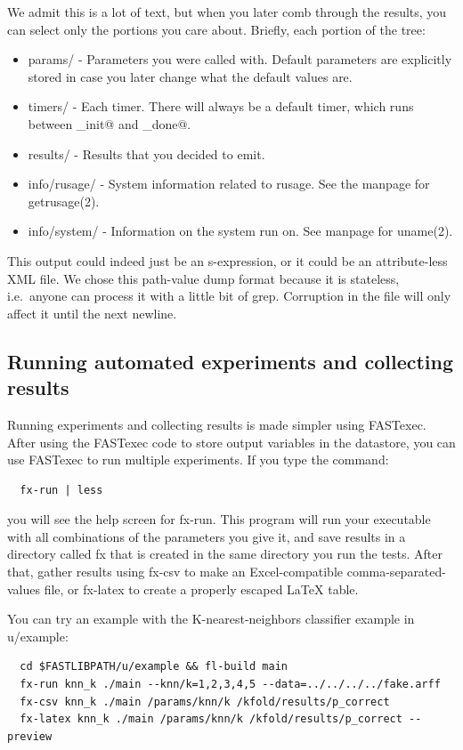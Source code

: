 \documentclass[letter]{report}
\begin{document}
We admit this is a lot of text, but when you later comb through the results, you can select only the portions you care about. Briefly, each portion of the tree:
\begin{itemize}
\item params/ - Parameters you were called with. Default parameters are explicitly stored in case you later change what the default values are.
\item timers/ - Each timer. There will always be a default timer, which runs between \verb@fx_init@ and \verb@fx_done@.
\item results/ - Results that you decided to emit.
\item info/rusage/ - System information related to rusage. See the manpage for getrusage(2).
\item info/system/ - Information on the system run on. See manpage for uname(2). 
\end{itemize}
This output could indeed just be an s-expression, or it could be an attribute-less XML file. We chose this path-value dump format because it is stateless, i.e.~anyone can process it with a little bit of grep. Corruption in the file will only affect it until the next newline.

\subsection{Running automated experiments and collecting results}

Running experiments and collecting results is made simpler using FASTexec. After using the FASTexec code to store output variables in the datastore, you can use FASTexec to run multiple experiments. If you type the command:
\begin{verbatim}
  fx-run | less
\end{verbatim}
you will see the help screen for fx-run. This program will run your executable with all combinations of the parameters you give it, and save results in a directory called fx that is created in the same directory you run the tests. After that, gather results using fx-csv to make an Excel-compatible comma-separated-values file, or fx-latex to create a properly escaped LaTeX table.

You can try an example with the K-nearest-neighbors classifier example in u/example:
\begin{verbatim}
  cd $FASTLIBPATH/u/example && fl-build main
  fx-run knn_k ./main --knn/k=1,2,3,4,5 --data=../../../../fake.arff
  fx-csv knn_k ./main /params/knn/k /kfold/results/p_correct
  fx-latex knn_k ./main /params/knn/k /kfold/results/p_correct --preview
\end{verbatim}
\end{document}
